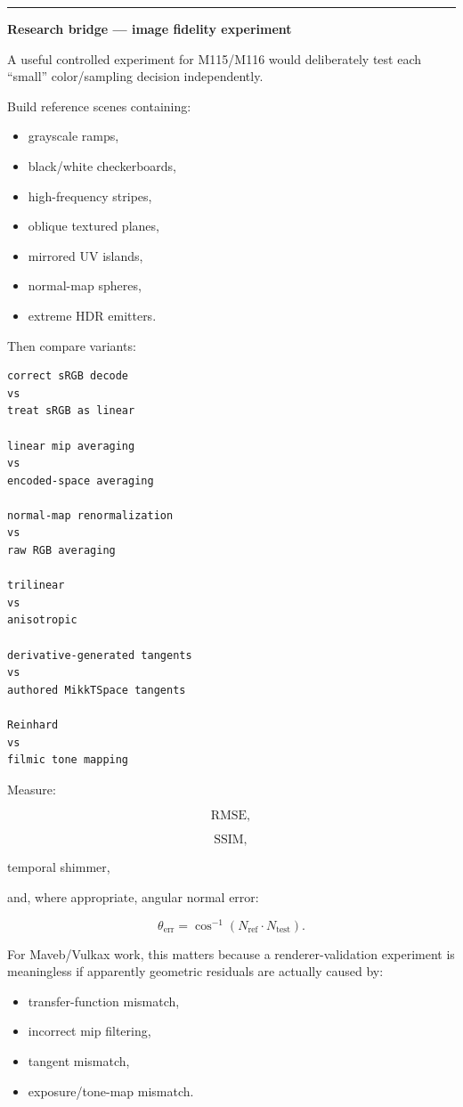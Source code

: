 \begin{center}\rule{0.5\linewidth}{0.5pt}\end{center}

\textbf{Research bridge --- image fidelity experiment}

A useful controlled experiment for M115/M116 would deliberately test each ``small'' color/sampling decision independently.

Build reference scenes containing:

\begin{itemize}
\tightlist
\item
  grayscale ramps,
\item
  black/white checkerboards,
\item
  high-frequency stripes,
\item
  oblique textured planes,
\item
  mirrored UV islands,
\item
  normal-map spheres,
\item
  extreme HDR emitters.
\end{itemize}

Then compare variants:

\begin{verbatim}
correct sRGB decode
vs
treat sRGB as linear

linear mip averaging
vs
encoded-space averaging

normal-map renormalization
vs
raw RGB averaging

trilinear
vs
anisotropic

derivative-generated tangents
vs
authored MikkTSpace tangents

Reinhard
vs
filmic tone mapping
\end{verbatim}

Measure:

\[
\text{RMSE},
\]

\[
\text{SSIM},
\]

temporal shimmer,

and, where appropriate, angular normal error:

\[
\boxed{
\theta_{\text{err}}
=
\cos^{-1}
(
N_{\text{ref}}\cdot N_{\text{test}}
)
}.
\]

For Maveb/Vulkax work, this matters because a renderer-validation experiment is meaningless if apparently geometric residuals are actually caused by:

\begin{itemize}
\tightlist
\item
  transfer-function mismatch,
\item
  incorrect mip filtering,
\item
  tangent mismatch,
\item
  exposure/tone-map mismatch.
\end{itemize}

